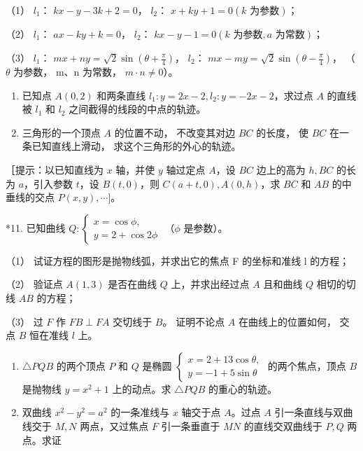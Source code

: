 （1） \(l_{1}\)： \(kx - y - 3k + 2 = 0\)， \(l_{2}\)：
\(x + ky + 1 = 0 (k \text{ 为参数})\)；

（2） \(l_{1}\)： \(ax - ky + k = 0\)， \(l_{2}\)：
\(kx - y - 1 = 0 (k \text{ 为参数}, a \text{ 为常数})\)；

（3） \(l_{1}\)：
\(mx + ny = \sqrt{2}\sin\left(\theta + \frac{\pi}{4}\right)\)，
\(l_{2}\)：
\(mx - my = \sqrt{2} \sin \left( \theta - \frac{\pi}{4} \right)\)，
（\(\theta\) 为参数， m、n 为常数， \(m \cdot n \neq 0\)）。

\begin{enumerate}
\def\labelenumi{\arabic{enumi}.}
\setcounter{enumi}{8}
\item
  已知点 \(A(0,2)\) 和两条直线
  \(l_{1}: y = 2x - 2, l_{2}: y = -2x - 2\)，求过点 \(A\) 的直线被
  \(l_{1}\) 和 \(l_{2}\) 之间截得的线段的中点的轨迹。
\item
  三角形的一个顶点 \(A\) 的位置不动， 不改变其对边 \(BC\) 的长度， 使
  \(BC\) 在一条已知直线上滑动， 求这个三角形的外心的轨迹。
\end{enumerate}

［提示：以已知直线为 \(x\) 轴，并使 \(y\) 轴过定点 \(A\)，设 \(BC\)
边上的高为 \(h, BC\) 的长为 \(a\)，引入参数 \(t\)，设 \(B(t, 0)\)，则
\(C(a + t, 0), A(0, h)\)，求 \(BC\) 和 \(AB\) 的中垂线的交点
\(P(x, y), \cdots]\)。

*11. 已知曲线
\(Q: \left\{ \begin{array}{l} x = \cos \phi, \\ y = 2 + \cos 2\phi \end{array} \right.\)
（\(\phi\) 是参数）。

（1） 试证方程的图形是抛物线弧，并求出它的焦点 F 的坐标和准线 l 的方程；

（2） 验证点 \(A(1,3)\) 是否在曲线 \(Q\) 上，并求出经过点 \(A\) 且和曲线
\(Q\) 相切的切线 \(AB\) 的方程；

（3） 过 \(F\) 作 \(FB \perp FA\) 交切线于 \(B\)。 证明不论点 \(A\)
在曲线上的位置如何， 交点 \(B\) 恒在准线 \(l\) 上。

\begin{enumerate}
\def\labelenumi{\arabic{enumi}.}
\setcounter{enumi}{11}
\item
  \(\triangle PQB\) 的两个顶点 \(P\) 和 \(Q\) 是椭圆
  \(\left\{ \begin{array}{l} x = 2 + 13\cos \theta, \\ y = -1 + 5\sin \theta \end{array} \right.\)
  的两个焦点，顶点 \(B\) 是抛物线 \(y = x^2 + 1\) 上的动点。求
  \(\triangle PQB\) 的重心的轨迹。
\item
  双曲线 \(x^{2} - y^{2} = a^{2}\) 的一条准线与 \(x\) 轴交于点
  \(A\)。过点 \(A\) 引一条直线与双曲线交于 \(M, N\) 两点，又过焦点 \(F\)
  引一条垂直于 \(MN\) 的直线交双曲线于 \(P, Q\) 两点。求证
\end{enumerate}

